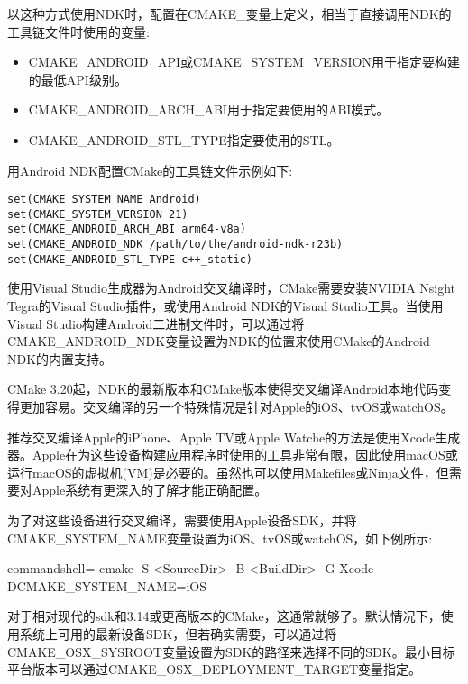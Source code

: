 以这种方式使用NDK时，配置在CMAKE\_变量上定义，相当于直接调用NDK的工具链文件时使用的变量:

\begin{itemize}
\item 
CMAKE\_ANDROID\_API或CMAKE\_SYSTEM\_VERSION用于指定要构建的最低API级别。

\item 
CMAKE\_ANDROID\_ARCH\_ABI用于指定要使用的ABI模式。

\item
CMAKE\_ANDROID\_STL\_TYPE指定要使用的STL。
\end{itemize}

用Android NDK配置CMake的工具链文件示例如下:

\begin{lstlisting}[style=styleCMake]
set(CMAKE_SYSTEM_NAME Android)
set(CMAKE_SYSTEM_VERSION 21)
set(CMAKE_ANDROID_ARCH_ABI arm64-v8a)
set(CMAKE_ANDROID_NDK /path/to/the/android-ndk-r23b)
set(CMAKE_ANDROID_STL_TYPE c++_static)
\end{lstlisting}

使用Visual Studio生成器为Android交叉编译时，CMake需要安装NVIDIA Nsight Tegra的Visual Studio插件，或使用Android NDK的Visual Studio工具。当使用Visual Studio构建Android二进制文件时，可以通过将CMAKE\_ANDROID\_NDK变量设置为NDK的位置来使用CMake的Android NDK的内置支持。

CMake 3.20起，NDK的最新版本和CMake版本使得交叉编译Android本地代码变得更加容易。交叉编译的另一个特殊情况是针对Apple的iOS、tvOS或watchOS。


推荐交叉编译Apple的iPhone、Apple TV或Apple Watche的方法是使用Xcode生成器。Apple在为这些设备构建应用程序时使用的工具非常有限，因此使用macOS或运行macOS的虚拟机(VM)是必要的。虽然也可以使用Makefiles或Ninja文件，但需要对Apple系统有更深入的了解才能正确配置。

为了对这些设备进行交叉编译，需要使用Apple设备SDK，并将CMAKE\_SYSTEM\_NAME变量设置为iOS、tvOS或watchOS，如下例所示:

\begin{tcblisting}{commandshell={}}
cmake -S <SourceDir> -B <BuildDir> -G Xcode -DCMAKE_SYSTEM_NAME=iOS
\end{tcblisting}

对于相对现代的sdk和3.14或更高版本的CMake，这通常就够了。默认情况下，使用系统上可用的最新设备SDK，但若确实需要，可以通过将CMAKE\_OSX\_SYSROOT变量设置为SDK的路径来选择不同的SDK。最小目标平台版本可以通过CMAKE\_OSX\_DEPLOYMENT\_TARGET变量指定。

